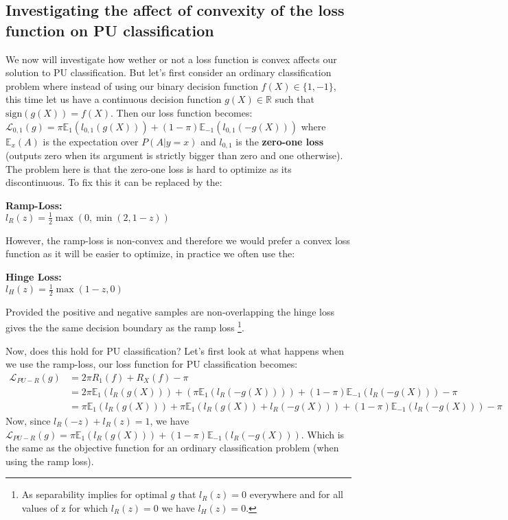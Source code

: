 \subsection{Investigating the affect of convexity of the loss function on PU classification}
We now will investigate how wether or not a loss function is convex affects our solution to PU classification. But let's first consider an ordinary classification problem where instead of using our binary decision function $f(X) \in \{1,-1\}$, this time let us have a continuous decision function $g(X) \in \mathbb{R}$ such that $\text{sign}(g(X)) = f(X)$. Then our loss function becomes: $\mathcal{L}_{0,1}(g) = \pi \mathbb{E}_{1} (l_{0,1} (g(X))) + (1- \pi) \mathbb{E}_{-1} (l_{0,1}(-g(X)))$ where $\mathbb{E}_{x}(A)$ is the expectation over $P(A| y=x)$ and $l_{0,1}$ is the \textbf{zero-one loss} (outputs zero when its argument is strictly bigger than zero and one otherwise). The problem here is that the zero-one loss is hard to optimize as its discontinuous. To fix this it can be replaced by the:
\begin{definition}
    \textbf{Ramp-Loss:} \\
    $l_{R}(z) = \frac{1}{2} \max(0, \min(2,1-z))$
\end{definition}
However, the ramp-loss is non-convex and therefore we would prefer a convex loss function as it will be easier to optimize, in practice we often use the:
\begin{definition}
    \textbf{Hinge Loss:} \\
    $l_{H}(z) = \frac{1}{2} \max(1-z,0)$
\end{definition}
Provided the positive and negative samples are non-overlapping the hinge loss gives the the same decision boundary as the ramp loss \footnote{As separability implies for optimal $g$ that $l_{R}(z)=0$ everywhere and for all values of z for which $l_{R}(z)=0$ we have $l_{H}(z)=0$.}. 

Now, does this hold for PU classification? Let's first look at what happens when we use the ramp-loss, our loss function for PU classification becomes:
\begin{align}
    \mathcal{L}_{PU-R}(g) &{} = 2 \pi R_{1}(f) + R_{X}(f) - \pi \\
    &= 2 \pi \mathbb{E}_{1} (l_{R}(g(X))) + (\pi \mathbb{E}_{1} (l_{R}(-g(X)))) + (1 - \pi) \mathbb{E}_{-1} (l_{R}(-g(X))) - \pi \\
    &= \pi \mathbb{E}_{1}(l_{R}(g(X))) + \pi \mathbb{E}_{1} (l_{R}(g(X)) + l_{R}(-g(X))) + (1-\pi) \mathbb{E}_{-1}(l_{R}(-g(X))) - \pi
\end{align} 
Now, since $l_{R}(-z)+l_{R}(z)=1$, we have $\mathcal{L}_{PU-R}(g) = \pi \mathbb{E}_{1} (l_{R}(g(X))) + (1-\pi) \mathbb{E}_{-1}(l_{R}(-g(X)))$. Which is the same as the objective function for an ordinary classification problem (when using the ramp loss). 

